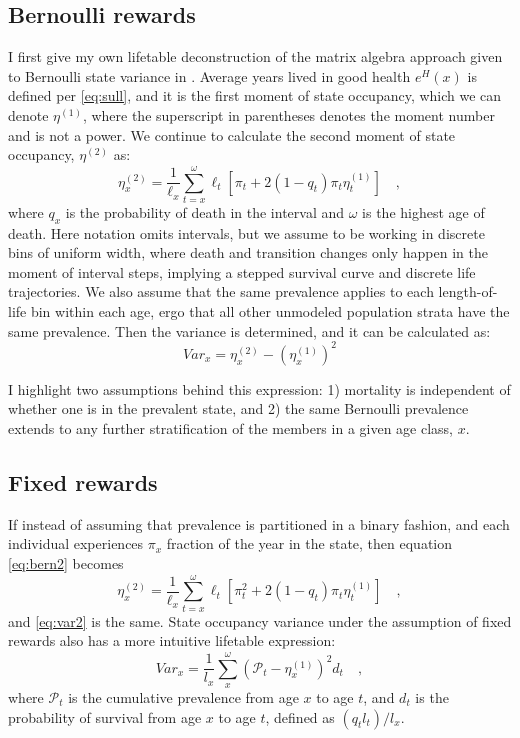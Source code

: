 \documentclass{bmcart}
\begin{document}
\subsection*{Bernoulli rewards}
I first give my own lifetable deconstruction of the matrix algebra approach given to Bernoulli state variance in \cite{caswell2018matrix}. Average years lived in good health $e^H(x)$ is defined per \eqref{eq:sull}, and it is the first moment of state occupancy, which we can denote $\eta^{(1)}$, where the superscript in parentheses denotes the moment number and is not a power. We continue to calculate the second moment of state occupancy, $\eta^{(2)}$ as:
\begin{equation}
\label{eq:bern2}
\eta^{(2)}_x = \frac{1}{\ell_x} \sum_{t=x}^\omega \ell_t\left[\pi_t + 2(1-q_t)\pi_t\eta^{(1)}_t\right] \quad \mathrm{,}
\end{equation}
where $q_x$ is the probability of death in the interval and $\omega$ is the highest age of death. Here notation omits intervals, but we assume to be working in discrete bins of uniform width, where death and transition changes only happen in the moment of interval steps, implying a stepped survival curve and discrete life trajectories. We also assume that the same prevalence applies to each length-of-life bin within each age, ergo that all other unmodeled population strata have the same prevalence. Then the variance is determined, and it can be calculated as:
\begin{equation}
\label{eq:var2}
Var_x = \eta^{(2)}_x - (\eta^{(1)}_x)^2
\end{equation}

I highlight two assumptions behind this expression: 1) mortality is independent of whether one is in the prevalent state, and 2) the same Bernoulli prevalence extends to any further stratification of the members in a given age class, $x$.

\subsection*{Fixed rewards}
If instead of assuming that prevalence is partitioned in a binary fashion, and each individual experiences $\pi_x$ fraction of the year in the state, then equation \eqref{eq:bern2} becomes
\begin{equation}
\eta^{(2)}_x = \frac{1}{\ell_x} \sum_{t=x}^\omega \ell_t\left[\pi_t^2 + 2(1-q_t)\pi_t\eta^{(1)}_t\right] \quad \mathrm{,}
\end{equation}
and \eqref{eq:var2} is the same. State occupancy variance under the assumption of fixed rewards also has a more intuitive lifetable expression:
\begin{equation}
\label{eq:varfixed2}
Var_x = \frac{1}{l_x}\sum_x^\omega (\mathcal{P}_t - \eta^{(1)}_x)^2 d_t \quad\mathrm{,}
\end{equation}
where $\mathcal{P}_t$ is the cumulative prevalence from age $x$ to age $t$, and $d_t$ is the probability of survival from age $x$ to age $t$, defined as $(q_t l_t)/l_x$. 
\end{document}
